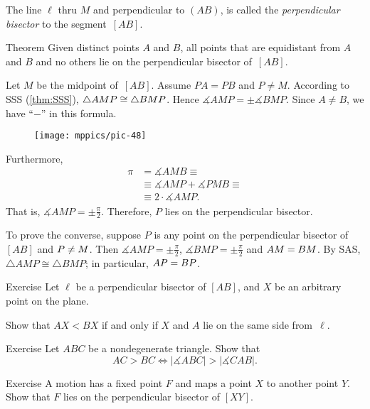 The line $\ell$ thru $M$ and perpendicular to $(AB)$,
is called the \emph{perpendicular bisector} to the segment~$[AB]$. 

\begin{thm}[\abs]{Theorem}\label{thm:perp-bisect}
Given distinct points $A$ and $B$,
all points that are equidistant from $A$ and $B$ and no
others lie on the perpendicular bisector of~$[A B]$.
\end{thm}

 Let $M$ be the midpoint of~$[A B]$.
Assume $P A= P B$ and $P\ne M$.
According to SSS (\ref{thm:SSS}),
$\triangle A M P \cong\triangle B M P$.
Hence
$\measuredangle A M P=\pm \measuredangle B M P$.
Since $A\not=B$, we have ``$-$'' in this formula.

\begin{wrapfigure}[8]{o}{34mm}
\centering
\texttt{[image: mppics/pic-48]}
\end{wrapfigure}

Furthermore,
\begin{align*}
\pi
&=
\measuredangle A M B
\equiv
\\
&\equiv\measuredangle A M P+\measuredangle P M B
\equiv
\\
&\equiv
2\cdot \measuredangle A M P.
\end{align*}
That is, $\measuredangle A M P
=
\pm
\tfrac\pi2$. 
Therefore, $P$ lies on the perpendicular bisector.


To prove the converse, 
suppose $P$ 
is any point on the perpendicular bisector of $[A B]$ and $P\ne M$.
Then $\measuredangle A M P=\pm \tfrac\pi2$, 
$\measuredangle B M P=\pm \tfrac\pi2$ and
$A M=B M$.
By SAS, $\triangle A M P\cong \triangle B M P$;
in particular, $A P= B P$.
\qeds


\begin{thm}{Exercise}\label{ex:pbisec-side}
Let $\ell$ be a perpendicular bisector of $[A B]$, and $X$ be an arbitrary point on the plane.

Show that 
$AX<BX$ if and only if $X$ and $A$ lie on the same side from~$\ell$.
\end{thm}

\begin{thm}{Exercise}\label{ex:side-angle}
Let $ABC$ be a nondegenerate triangle.
Show that 
\[AC>BC\iff|\measuredangle ABC|>|\measuredangle CAB|.\] 
\end{thm}

\begin{thm}{Exercise}\label{ex:pbisec-motion}
A motion has a fixed point $F$ and maps a point $X$ to another point $Y$.
Show that $F$ lies on the perpendicular bisector of $[XY]$.
\end{thm}




